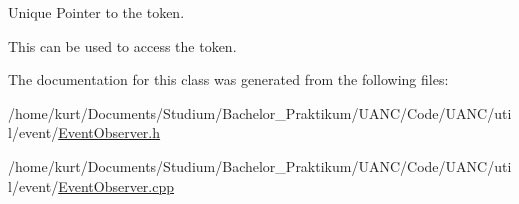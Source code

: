 Unique Pointer to the token. 

This can be used to access the token. 

The documentation for this class was generated from the following files\+:\begin{DoxyCompactItemize}
\item 
/home/kurt/\+Documents/\+Studium/\+Bachelor\+\_\+\+Praktikum/\+U\+A\+N\+C/\+Code/\+U\+A\+N\+C/util/event/\hyperlink{_event_observer_8h}{Event\+Observer.\+h}\item 
/home/kurt/\+Documents/\+Studium/\+Bachelor\+\_\+\+Praktikum/\+U\+A\+N\+C/\+Code/\+U\+A\+N\+C/util/event/\hyperlink{_event_observer_8cpp}{Event\+Observer.\+cpp}\end{DoxyCompactItemize}
